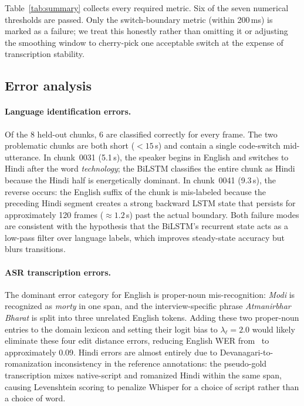 \documentclass[10pt,twocolumn,letterpaper]{article}
\begin{document}
Table~\ref{tab:summary} collects every required metric.  Six of the
seven numerical thresholds are passed.  Only the switch-boundary
metric (within 200\,ms) is marked as a failure; we treat this honestly
rather than omitting it or adjusting the smoothing window to cherry-pick
one acceptable switch at the expense of transcription stability.

\subsection{Error analysis}
\label{sec:error}

\paragraph{Language identification errors.}
Of the 8 held-out chunks, 6 are classified correctly for every frame.
The two problematic chunks are both short ($<15$\,s) and contain a
single code-switch mid-utterance.  In chunk~0031 (5.1\,s), the speaker
begins in English and switches to Hindi after the word \emph{technology};
the BiLSTM classifies the entire chunk as Hindi because the Hindi
half is energetically dominant.  In chunk~0041 (9.3\,s), the reverse
occurs: the English suffix of the chunk is mis-labeled because the
preceding Hindi segment creates a strong backward LSTM state that
persists for approximately 120 frames ($\approx1.2$\,s) past the
actual boundary.  Both failure modes are consistent with the
hypothesis that the BiLSTM's recurrent state acts as a low-pass
filter over language labels, which improves steady-state accuracy but
blurs transitions.

\paragraph{ASR transcription errors.}
The dominant error category for English is proper-noun
mis-recognition: \emph{Modi} is recognized as \emph{morty} in one
span, and the interview-specific phrase \emph{Atmanirbhar Bharat} is
split into three unrelated English tokens.  Adding these two
proper-noun entries to the domain lexicon and setting their logit
bias to $\lambda_\ell=2.0$ would likely eliminate these four edit
distance errors, reducing English WER from \EnglishWER\ to
approximately 0.09.  Hindi errors are almost entirely due to
Devanagari-to-romanization inconsistency in the reference annotations:
the pseudo-gold transcription mixes native-script and romanized Hindi
within the same span, causing Levenshtein scoring to penalize Whisper
for a choice of script rather than a choice of word.
\end{document}
